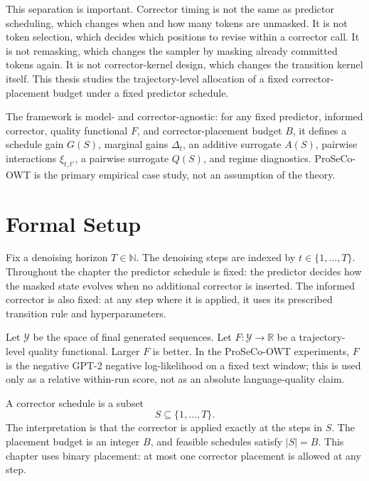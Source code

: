 This separation is important. Corrector timing is not the same as predictor
scheduling, which changes when and how many tokens are unmasked. It is not
token selection, which decides which positions to revise within a corrector
call. It is not remasking, which changes the sampler by masking already
committed tokens again. It is not corrector-kernel design, which changes the
transition kernel itself. This thesis studies the trajectory-level allocation
of a fixed corrector-placement budget under a fixed predictor schedule.

The framework is model- and corrector-agnostic: for any fixed predictor,
informed corrector, quality functional $F$, and corrector-placement budget
$B$, it defines a schedule gain $G(S)$, marginal gains $\Delta_t$, an additive
surrogate $A(S)$, pairwise interactions $\xi_{t,t'}$, a pairwise surrogate
$Q(S)$, and regime diagnostics. ProSeCo-OWT is the primary empirical case study,
not an assumption of the theory.

\section{Formal Setup}
\label{sec:ch6-formal-setup}

Fix a denoising horizon $T \in \mathbb{N}$. The denoising steps are indexed by
$t \in \{1,\ldots,T\}$. Throughout the chapter the predictor schedule is fixed:
the predictor decides how the masked state evolves when no additional corrector
is inserted. The informed corrector is also fixed: at any step where it is
applied, it uses its prescribed transition rule and hyperparameters.

Let $\mathcal{Y}$ be the space of final generated sequences. Let
$F:\mathcal{Y}\to\mathbb{R}$ be a trajectory-level quality functional. Larger
$F$ is better. In the ProSeCo-OWT experiments, $F$ is the negative GPT-2
negative log-likelihood on a fixed text window; this is used only as a relative
within-run score, not as an absolute language-quality claim.

\begin{definition}
\label{def:ch6-schedule}
A corrector schedule is a subset
\[
  S \subseteq \{1,\ldots,T\}.
\]
The interpretation is that the corrector is applied exactly at the steps in
$S$. The placement budget is an integer $B$, and feasible schedules satisfy
$|S|=B$. This chapter uses binary placement: at most one corrector placement is
allowed at any step.
\end{definition}

